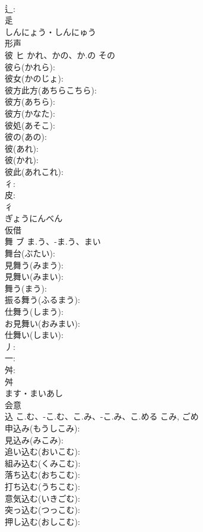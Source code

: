 \documentclass[8pt]{extreport}
\begin{document}
\begin{CJK}{UTF8}{min}
\\	辶: 
\\	辵	
\\	しんにょう・しんにゅう	
\\	形声 
\\	彼	ヒ	かれ、かの、か.の	その	
\\	彼ら(かれら): 
\\	彼女(かのじょ): 
\\	彼方此方(あちらこちら): 
\\	彼方(あちら): 
\\	彼方(かなた): 
\\	彼処(あそこ): 
\\	彼の(あの): 
\\	彼(あれ): 
\\	彼(かれ): 
\\	彼此(あれこれ): 
\\	彳: 
\\	皮: 
\\	彳	
\\	ぎょうにんべん	
\\	仮借 
\\	舞	ブ	ま.う、-ま.う、まい		
\\	舞台(ぶたい): 
\\	見舞う(みまう): 
\\	見舞い(みまい): 
\\	舞う(まう): 
\\	振る舞う(ふるまう): 
\\	仕舞う(しまう): 
\\	お見舞い(おみまい): 
\\	仕舞い(しまい): 
\\	丿: 
\\	一: 
\\	舛: 
\\	舛	
\\	ます・まいあし	
\\	会意 
\\	込		こ.む、-こ.む、こ.み、-こ.み、こ.める	こみ, ごめ	
\\	申込み(もうしこみ): 
\\	見込み(みこみ): 
\\	追い込む(おいこむ): 
\\	組み込む(くみこむ): 
\\	落ち込む(おちこむ): 
\\	打ち込む(うちこむ): 
\\	意気込む(いきごむ): 
\\	突っ込む(つっこむ): 
\\	押し込む(おしこむ): 

\end{CJK}
\end{document}
